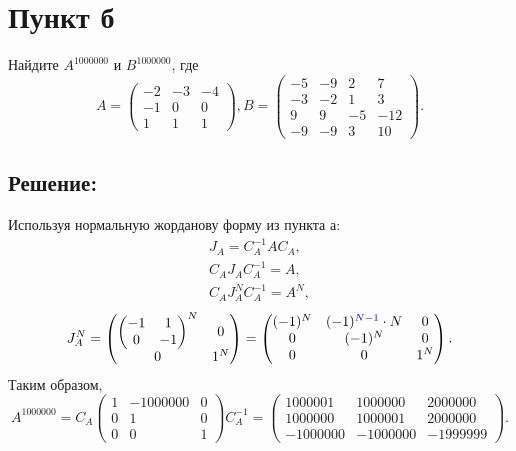 \documentclass[12pt]{article}
\begin{document}
    \section*{Пункт б}
    Найдите $A^{1000000}$ и $B^{1000000}$, где
    \[
        A =
        \begin{pmatrix}
            -2 & -3 & -4 \\
            -1 & 0  & 0  \\
            1  & 1  & 1
        \end{pmatrix},
        B =
        \begin{pmatrix}
            -5 & -9 & 2  & 7   \\
            -3 & -2 & 1  & 3   \\
            9  & 9  & -5 & -12 \\
            -9 & -9 & 3  & 10
        \end{pmatrix}.
    \]

    \subsection*{Решение:}
    Используя нормальную жорданову форму из пункта а:
        {
        \color{blue}
        \begin{gather*}
            J_A = C_A^{-1} A C_A , \\
            C_A J_A C_A^{-1} = A , \\
            C_A J_A^N C_A^{-1} = A^N ,
        \end{gather*}
    }
    \[
        J_A^N
        = \begin{pmatrix}
              \begin{pmatrix}
                  -1 & 1  \\
                  0  & -1
              \end{pmatrix}^N & 0 \\
              0 & 1^N
        \end{pmatrix}
        = \begin{pmatrix}
        (-1)
              ^N & (-1)^{\textcolor{blue}{N-1}} \cdot N & 0   \\
              0  & (-1)^N                               & 0   \\
              0  & 0                                    & 1^N
        \end{pmatrix} .
    \]
    Таким образом,
        {
        \color{blue}
        \[
            A^{1000000}
            = C_A
            \begin{pmatrix}
                1 & -1000000 & 0 \\
                0 & 1        & 0 \\
                0 & 0        & 1
            \end{pmatrix}
            C_A^{-1}
            = \begin{pmatrix}
                  1000001  & 1000000  & 2000000  \\
                  1000000  & 1000001  & 2000000  \\
                  -1000000 & -1000000 & -1999999
            \end{pmatrix} .
        \]
    }
\end{document}
